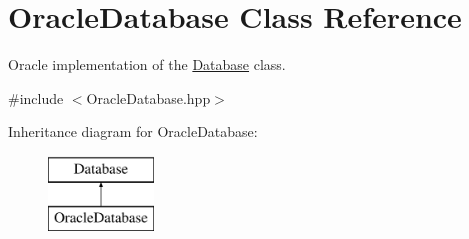 \hypertarget{classOracleDatabase}{
\section{OracleDatabase Class Reference}
\label{classOracleDatabase}
}


Oracle implementation of the \hyperlink{classDatabase}{Database} class.  




{\ttfamily \#include $<$OracleDatabase.hpp$>$}

Inheritance diagram for OracleDatabase:\begin{figure}[H]
\begin{center}
\leavevmode
\includegraphics[height=2.000000cm]{classOracleDatabase}
\end{center}
\end{figure}
